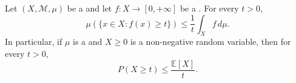 \begin{proposition} \label{proposition:markov_inequality_for_non_negative_measurable_functions}
Let $(X, \mathcal{M}, \mu)$ be a  and let $f : X \to [0, +\infty]$ be a . For every $t > 0$,
$$\mu(\{x \in X : f(x) \geq t\}) \leq \frac{1}{t} \int_X f \, d\mu.$$
In particular, if $\mu$ is a  and $X \geq 0$ is a non-negative random variable, then for every $t > 0$,
$$P(X \geq t) \leq \frac{\mathbb{E}[X]}{t}.$$
\end{proposition}

